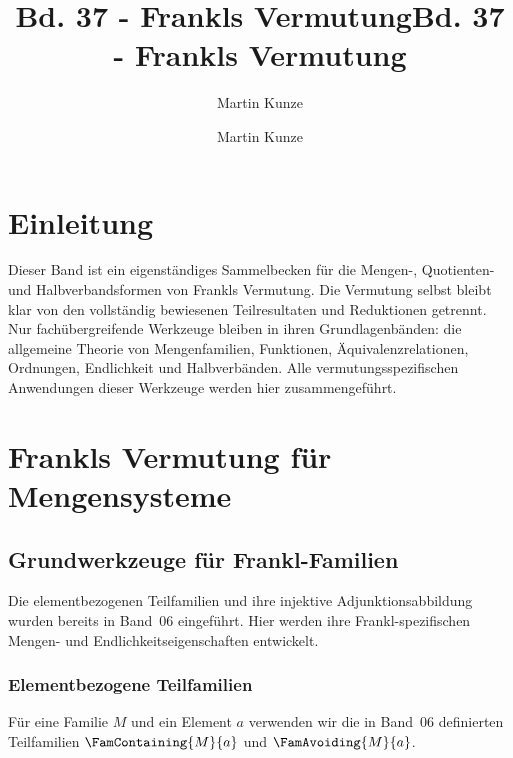 \documentclass[main.tex]{subfiles}
\title{Bd. 37 - Frankls Vermutung}
\author{Martin Kunze}
\date{}
\begin{document}
\title{Bd. 37 - Frankls Vermutung}
\author{Martin Kunze}
\date{}
\hypersetup{pageanchor=false}
\maketitle
\hypersetup{pageanchor=true}
\setcounter{tocdepth}{3}
\tableofcontents
\setcounter{file}{37}
\renewcommand{\FormulaBandID}{37}
\newcommand{\ProofRefStack}[1]{%
  \ensuremath{\begin{gathered}#1\end{gathered}}}

\chapter{Einleitung}

Dieser Band ist ein eigenständiges Sammelbecken für die Mengen-, Quotienten-
und Halbverbandsformen von Frankls Vermutung. Die Vermutung selbst bleibt
klar von den vollständig bewiesenen Teilresultaten und Reduktionen getrennt.
Nur fachübergreifende Werkzeuge bleiben in ihren Grundlagenbänden: die
allgemeine Theorie von Mengenfamilien, Funktionen, Äquivalenzrelationen,
Ordnungen, Endlichkeit und Halbverbänden. Alle vermutungsspezifischen
Anwendungen dieser Werkzeuge werden hier zusammengeführt.

\chapter{Frankls Vermutung für Mengensysteme}

\section{Grundwerkzeuge für Frankl-Familien}

Die elementbezogenen Teilfamilien und ihre injektive Adjunktionsabbildung
wurden bereits in Band~06 eingeführt. Hier werden ihre
Frankl-spezifischen Mengen- und Endlichkeitseigenschaften entwickelt.

\subsection{Elementbezogene Teilfamilien}

Für eine Familie \(M\) und ein Element \(a\) verwenden wir die in Band~06
definierten Teilfamilien \(\FamContaining{M}{a}\) und
\(\FamAvoiding{M}{a}\).

\begin{tabproof}
\end{tabproof}
\end{document}
